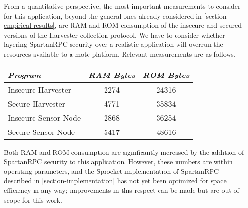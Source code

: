 From a quantitative perspective, the most important measurements to
consider for this application, beyond the general ones already
considered in \autoref{section-empirical-results}, are RAM and ROM
consumption of the insecure and secured versions of the Harvester
collection protocol. We have to consider whether layering SpartanRPC
security over a realistic application will overrun the resources
available to a mote platform. Relevant measurements are as follows.
\begin{table}[h]
\centering \newcommand\T{\rule{0pt}{2.1ex}}
  {
  \begin{tabular}{|l|c|c|} \hline
    \emph{Program}       \T & \emph{RAM Bytes} & \emph{ROM Bytes} \\ \hline\hline
    Insecure Harvester   \T & 2274             & 24316 \\ \hline
    Secure Harvester     \T & 4771             & 35834 \\ \hline
    Insecure Sensor Node \T & 2868             & 36254 \\ \hline
    Secure Sensor Node   \T & 5417             & 48616 \\ \hline
  \end{tabular}
  }
  \label{table-snowcloud}
\end{table}

Both RAM and ROM consumption are significantly increased by the addition
of SpartanRPC security to this application. However, these numbers are
within operating parameters, and the Sprocket implementation of
SpartanRPC described in \autoref{section-implementation} has not yet
been optimized for space efficiency in any way; improvements in this
respect can be made but are out of scope for this work.
